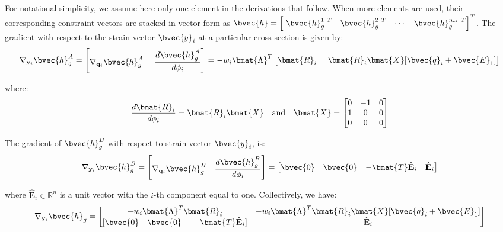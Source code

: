 \begin{appendices}
\noindent For notational simplicity, we assume here only one element
in the derivations that follow. When more elements are used, their
corresponding constraint vectors are stacked in vector form as
$\bvec{h} = \begin{bmatrix}
	\ \bvec{h}_g^{1\ T}& \bvec{h}_g^{2\ T}& \cdots & \bvec{h}_g^{n_{el}\ T}
\end{bmatrix}^T$.
The gradient with respect to the strain vector
$\bvec{y}_i$ at a particular cross-section is given by:
\begin{gather}
	\nabla_{\mathbf{y}_i}\bvec{h}_g^A = \begin{bmatrix}
		\nabla_{\mathbf{q}_i}\bvec{h}_g^A &\ \dfrac{d \bvec{h}_g^A}{d\phi_i}
	\end{bmatrix} = -w_i\bmat{\Lambda}^T\begin{bmatrix}
		\bmat{R}_i &\
		\bmat{R}_i\bmat{X}[\bvec{q}_i+\bvec{E}_1]
	\end{bmatrix}\nonumber
\end{gather}

\noindent where:
\begin{gather}
	\frac{d\bmat{R}_i}{d\phi_i} = \bmat{R}_i\bmat{X}\quad\text{and}\quad
	\bmat{X} = \begin{bmatrix}
		0 & -1 & 0\\
		1 &  0 & 0\\
		0 &  0 & 0
	\end{bmatrix}\nonumber
\end{gather}

\noindent The gradient of $\bvec{h}_g^B$ with respect to strain vector
$\bvec{y}_i$, is:
\begin{gather}
	\nabla_{\mathbf{y}_i}\bvec{h}_g^B = \begin{bmatrix}
		\nabla_{\mathbf{q}_i}\bvec{h}_g^B & \dfrac{d \bvec{h}_g^B}{d\phi_i}
	\end{bmatrix} = \begin{bmatrix}
		\bvec{0} & \bvec{0} & -\bmat{T}\hat{\mathbf{E}}_i & \hat{\mathbf{E}}_i
	\end{bmatrix}\nonumber
\end{gather}

\noindent where $\hat{\mathbf{E}}_i\in\mathbb{R}^n$ is a unit vector with the
$i$-th component equal to one.
\noindent Collectively, we have:
\begin{gather}
	\nabla_{\mathbf{y}_i}\bvec{h}_g = \begin{bmatrix}
		-w_i\bmat{\Lambda}^T\bmat{R}_i & -w_i\bmat{\Lambda}^T
		\bmat{R}_i\bmat{X}[\bvec{q}_i+\bvec{E}_1]\\
		[\bvec{0}\quad \bvec{0}\quad -\bmat{T}\hat{\mathbf{E}}_i] & 
		\hat{\mathbf{E}}_i
	\end{bmatrix}
	\label{eq:con1}
\end{gather}


\end{appendices}
